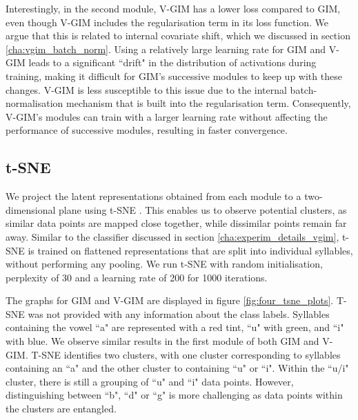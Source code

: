 		Interestingly, in the second module, V-GIM has a lower loss compared to GIM, even though V-GIM includes the regularisation term in its loss function. We argue that this is related to internal covariate shift, which we discussed in section \ref{cha:vgim_batch_norm}. Using a relatively large learning rate for GIM and V-GIM leads to a significant ``drift" in the distribution of activations during training, making it difficult for GIM's successive modules to keep up with these changes. V-GIM is less susceptible to this issue due to the internal batch-normalisation mechanism that is built into the regularisation term. Consequently, V-GIM's modules can train with a larger learning rate without affecting the performance of successive modules, resulting in faster convergence. %
		
		
		  



		
	\subsection{t-SNE} %
	We project the latent representations obtained from each module to a two-dimensional plane using t-SNE \citep{maatenVisualizingDataUsing2008}. This enables us to observe potential clusters, as similar data points are mapped close together, while dissimilar points remain far away. Similar to the classifier discussed in section \ref{cha:experim_details_vgim}, t-SNE is trained on flattened representations that are split into individual syllables, without performing any pooling. We run t-SNE with random initialisation, perplexity of 30 and a learning rate of 200 for 1000 iterations.
	
	The graphs for GIM and V-GIM are displayed in figure \ref{fig:four_tsne_plots}. T-SNE was not provided with any information about the class labels. Syllables containing the vowel ``a" are represented with a red tint, ``u" with green, and ``i" with blue. We observe similar results in the first module of both GIM and V-GIM. T-SNE identifies two clusters, with one cluster corresponding to syllables containing an ``a" and the other cluster to containing ``u" or ``i". Within the ``u/i" cluster, there is still a grouping of ``u" and ``i" data points. However, distinguishing between ``b", ``d" or ``g" is more challenging as data points within the clusters are entangled.
	
